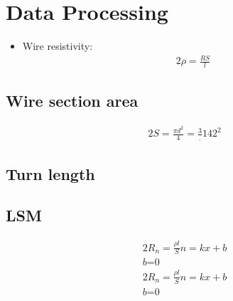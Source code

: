 \documentclass{article}%
\begin{document}
%
\normalsize%
\section{\textbf{Data Processing}}%
\label{sec:textbfDataProcessing}%
\begin{itemize}%
\item%
Wire resistivity: %
\begin{alignat*}{2}%
\rho =\frac{RS}{l}%
\end{alignat*}%
\end{itemize}%
\subsection{\textbf{Wire section area}}%
\label{subsec:textbfWiresectionarea}%
\begin{alignat*}{2}%
S=\frac{\pi d^2}{4}=%
\frac3.142^2%
\end{alignat*}

%
\subsection{\textbf{Turn length}}%
\label{subsec:textbfTurnlength}%

%
\subsection{\textbf{LSM}}%
\label{subsec:textbfLSM}%
\begin{alignat*}{2}%
{R_n}=\frac{\rho l}{S} n=k x + b\\%
\textit{b=0}%
\end{alignat*}%
\begin{alignat*}{2}%
{R_n}=\frac{\rho l}{S} n=k x + b\\%
\textit{b=0}%
\end{alignat*}

%
\end{document}

